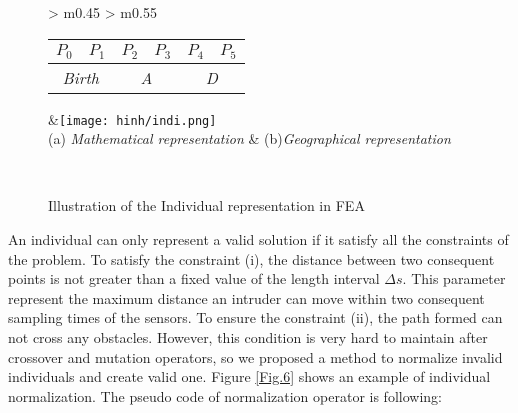 \documentclass[final]{elsarticle}
\begin{document}
\begin{figure*}[h]
	\renewcommand{\arraystretch}{1.5}
	\centering
	\begin{tabular}{ >{\centering\arraybackslash} m{0.45\linewidth} >{\centering\arraybackslash} m{0.55\linewidth} }
		\begin{tabular}{|c|c|c|c|c|c|}
			\hline 
			$P_0$ & $P_1$ & $P_2$ & $P_3$ & $P_4$ & $P_5$  \\
			\hline \hline
			\multicolumn{2}{|c|}{\textit{Birth}} & \multicolumn{2}{c|}{\textit{A}}  & \multicolumn{2}{c|}{\textit{D}}  \\
			\hline
		\end{tabular} &\texttt{[image: hinh/indi.png]} \\
		(a) \textit{Mathematical representation} & (b)\textit{Geographical representation} \\
	\end{tabular}
	\\
	\caption{Illustration of the Individual representation in FEA
	}
	\label{Fig.4}       %
\end{figure*}

An individual can only represent a valid solution if it satisfy all the constraints of the problem. To satisfy the constraint (i), the distance between two consequent points is not greater than a fixed value of the length interval $\Delta s$. This parameter represent the maximum distance an intruder can move within two consequent sampling times of the sensors. To ensure the constraint (ii), the path formed can not cross any obstacles. However, this condition is very hard to maintain after crossover and mutation operators, so we proposed a method to normalize invalid individuals and create valid one. Figure \ref{Fig.6} shows an example of individual normalization. The pseudo code of normalization operator is following:
\end{document}
